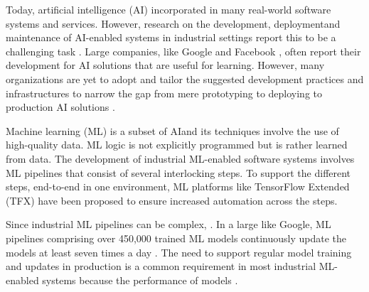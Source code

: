 Today, artificial intelligence (AI) \DIFdelbegin {}\DIFdelend \DIFaddbegin {}\DIFaddend incorporated in many real-world software systems and services. However, research on the development, deployment\DIFaddbegin \DIFadd{, }\DIFaddend and maintenance of AI-enabled systems in industrial settings report this to be a challenging task \cite{Sculley2015, Lwakatare2019}. Large companies, like Google \cite{Baylor2017} and Facebook \cite{Hazelwood2018Facebook}, often report their development \DIFdelbegin {}\DIFdelend \DIFaddbegin {}\DIFaddend for AI solutions that are useful for learning. However, many organizations are yet to adopt and tailor the suggested development practices and infrastructures to narrow the gap from mere prototyping to deploying to production AI solutions \cite{Serban2020Practices}. 

Machine learning (ML) is a subset of AI\DIFaddbegin \DIFadd{, }\DIFaddend and its techniques involve the use of high-quality data. \DIFdelbegin {}\DIFdelend ML logic is not explicitly programmed but is rather learned from data. The development of industrial ML-enabled software systems involves ML pipelines that consist of several interlocking steps. To support the different steps, end-to-end in one environment, ML platforms like TensorFlow Extended (TFX) \cite{Baylor2017} \DIFdelbegin \DIFdel{, }\DIFdelend have been proposed to ensure increased automation across the steps.

Since industrial ML pipelines can be complex, \DIFdelbegin {}\DIFdelend \DIFaddbegin {}\DIFaddend . In a large \DIFdelbegin {}\DIFdelend \DIFaddbegin {}\DIFaddend like Google, \DIFdelbegin {}\DIFdelend \DIFaddbegin {} ML pipelines comprising \DIFdelbegin {}\DIFdelend over 450,000 trained ML models continuously update the models at least seven times a day  \cite{Doris2021MLPipelines}. %
The need to support regular model training and updates in production is a common requirement in most industrial ML-enabled systems because \DIFdelbegin {}\DIFdelend the performance of models \DIFdelbegin {}\DIFdelend \DIFaddbegin {}\DIFaddend \cite{Sculley2015}.

